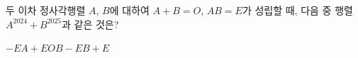 \hspace*{2mm}\begin{minipage}[t]{\dimexpr\linewidth-2mm\relax}\vspace{0pt}
두 이차 정사각행렬 $A$, $B$에 대하여 $A+B=O$, $AB=E$가 성립할 때, 다음 중 행렬 $A^{2024}+B^{2025}$과 같은 것은?
\begin{choices32}{$-E$}{$A+E$}{$O$}{$B-E$}{$B+E$}\end{choices32}\end{minipage}
